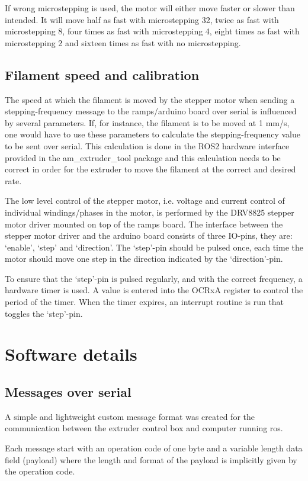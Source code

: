 \documentclass[10pt]{article}
\begin{document}
If wrong microstepping is used, the motor will either move faster or slower than intended. It will move half as fast with microstepping 32, twice as fast with microstepping 8, four times as fast with microstepping 4, eight times as fast with microstepping 2 and sixteen times as fast with no microstepping.

\subsection{Filament speed and calibration}
The speed at which the filament is moved by the stepper motor when sending a stepping-frequency message to the ramps/arduino board over serial is influenced by several parameters. If, for instance, the filament is to be moved at 1 mm/s, one would have to use these parameters to calculate the stepping-frequency value to be sent over serial. This calculation is done in the ROS2 hardware interface provided in the am\_extruder\_tool package and this calculation needs to be correct in order for the extruder to move the filament at the correct and desired rate.

The low level control of the stepper motor, i.e. voltage and current control of individual windings/phases in the motor, is performed by the DRV8825 stepper motor driver mounted on top of the ramps board. The interface between the stepper motor driver and the arduino board consists of three IO-pins, they are: `enable', `step' and `direction'. The `step'-pin should be pulsed once, each time the motor should move one step in the direction indicated by the `direction'-pin.

To ensure that the `step'-pin is pulsed regularly, and with the correct frequency, a hardware timer is used. A value is entered into the OCRxA register to control the period of the timer. When the timer expires, an interrupt routine is run that toggles the `step'-pin.

\newpage
\section{Software details}

\subsection{Messages over serial}
A simple and lightweight custom message format was created for the communication between the extruder control box and computer running ros.

Each message start with an operation code of one byte and a variable length data field (payload) where the length and format of the payload is implicitly given by the operation code.
\end{document}
